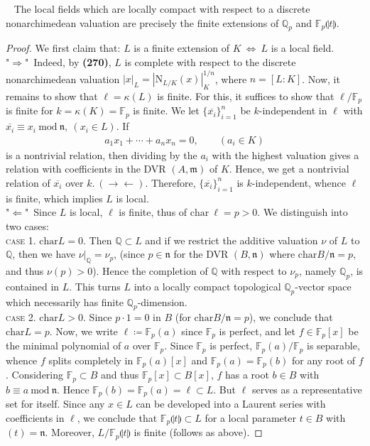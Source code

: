 \documentclass[12pt,a4paper,footinclude=true,headinclude=true]{scrbook} %
\newenvironment{proposition}[2][]
{\renewcommand\theinnercustomprop{#2}\innercustomprop[#1] 
\begin{mdframed}[backgroundcolor=gray!20]\ }
{\end{mdframed}\endinnercustomprop}
\begin{document}
\begin{proposition}{281}
    The local fields which are locally compact with respect to a discrete nonarchimedean valuation are precisely the finite extensions of $\mathbb{Q}_p$ and $\mathbb{F}_p\llparenthesis t\rrparenthesis$.
\end{proposition}
\begin{proof}
    We first claim that: $L$ is a finite extension of $K\ \Leftrightarrow\ L$ is a  local field.\\ "$\Rightarrow$"\ Indeed, by \textbf{(270)}, $L$ is complete with respect to the discrete nonarchimedean valuation $|x|_L=|\mathrm{N}_{L/K}(x)|_K^{1/n}$, where $n=[L:K]$. Now, it remains to show that $\ell=\kappa(L)$ is finite. For this, it suffices to show that $\ell/\mathbb{F}_p$ is finite for $k=\kappa(K)=\mathbb{F}_p$ is finite. We let $\{\overline{x_i}\}_{i=1}^n$ be $k$-independent in $\ell$ with $\overline{x_i}\equiv x_i\ \mathrm{mod}\ \mathfrak{n},\ (x_i\in L)$. If 
    \begin{align*}
        a_1x_1+\cdots+a_nx_n=0,\qquad(a_i\in K)
    \end{align*}
    is a nontrivial relation, then dividing by the $a_i$ with the highest valuation gives a relation with coefficients in the DVR $(A,\mathfrak{m})$ of $K$. Hence, we get a nontrivial relation of $\overline{x_i}$ over $k.\ (\to\gets)$. Therefore, $\{\overline{x_i}\}_{i=1}^n$ is $k$-independent, whence $\ell$ is finite, which implies $L$ is local.\\
    "$\Leftarrow$"\ Since $L$ is local, $\ell$ is finite, thus of $\mathrm{char}\ \ell=p>0$. We distinguish into two cases:\\
    \textsc{case 1.} $\mathrm{char}L=0$. Then $\mathbb{Q}\subset L$ and if we restrict the additive valuation $\nu$ of $L$ to $\mathbb{Q}$, then we have $\nu|_{\mathbb{Q}}=\nu_p$, (since $p\in\mathfrak{n}$ for the DVR $(B,\mathfrak{n})$ where $\mathrm{char}B/\mathfrak{n}=p$, and thus $\nu(p)>0$). Hence the completion of $\mathbb{Q}$ with respect to $\nu_p$, namely $\mathbb{Q}_p$, is contained in $L$. This turns $L$ into a locally compact topological $\mathbb{Q}_p$-vector space which necessarily has finite $\mathbb{Q}_p$-dimension.\\
    \textsc{case 2.} $\mathrm{char}L>0$. Since $p\cdot1=0$ in $B$ (for $\mathrm{char}B/\mathfrak{n}=p$), we conclude that $\mathrm{char}L=p$. Now, we write $\ell\coloneqq\mathbb{F}_p(a)$ since $\mathbb{F}_p$ is perfect, and let $f\in\mathbb{F}_p[x]$ be the minimal polynomial of $a$ over $\mathbb{F}_p$. Since $\mathbb{F}_p$ is perfect, $\mathbb{F}_p(a)/\mathbb{F}_p$ is separable, whence $f$ splits completely in $\mathbb{F}_p(a)[x]$ and $\mathbb{F}_p(a)=\mathbb{F}_p(b)$ for any root of $f$. Considering $\mathbb{F}_p\subset B$ and thus $\mathbb{F}_p[x]\subset B[x]$, $f$ has a root $b\in B$ with $b\equiv a\ \mathrm{mod}\ \mathfrak{n}$. Hence $\mathbb{F}_p(b)=\mathbb{F}_p(a)=\ell\subset L$. But $\ell$ serves as a representative set for itself. Since any $x\in L$ can be developed into a Laurent series with coefficients in $\ell$, we conclude that $\mathbb{F}_p\llparenthesis t\rrparenthesis\subset L$ for a local parameter $t\in B$ with $(t)=\mathfrak{n}$. Moreover, $L/\mathbb{F}_p\llparenthesis t\rrparenthesis$ is finite (follows as above).

\end{proof}
\end{document}
